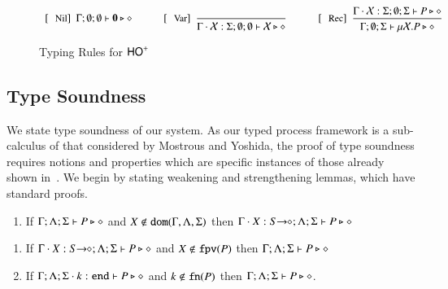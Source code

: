 \begin{figure}[!t]
\[\begin{array}{c}
		\trule{Nil}~~\Gamma; \emptyset; \emptyset \proves \inact \hastype \Proc
\qquad \quad
		\trule{Var}~~\tree{
	
		}{
			\Gamma \cat \rvar{X}: \Sigma; \emptyset; \emptyset  \proves \rvar{X} \hastype \Proc
		}
		\qquad\quad 

	 	\trule{Rec}~~\tree{
			\Gamma \cat \rvar{X}: \Sigma; \emptyset; \Sigma  \proves P \hastype \Proc
		}{
			\Gamma ; \emptyset; \Sigma  \proves \recp{X}{P} \hastype \Proc
		}


	\end{array}
\]
\caption{Typing Rules for $\mathsf{HO}^+$\label{fig:typerulesmy}}
\end{figure}
\newpage


\subsection{Type Soundness}
We state type soundness of our system.
As our typed process framework is a sub-calculus of that considered by Mostrous and Yoshida, the proof of type soundness requires notions and properties which are specific instances of those already shown in~\cite{}.
We begin by stating weakening and strengthening lemmas, which have standard proofs.



\begin{lemma}\label{l:weak}
\begin{enumerate}[$-$]
\item If $\Gamma; \Lambda; \Sigma   \vdash P \triangleright \diamond$ and $X \not\in \mathtt{dom}(\Gamma,\Lambda,\Sigma)$ then $\Gamma\cdot X: S\!\! \rightarrow\!\! \diamond; \Lambda; \Sigma   \vdash P \triangleright \diamond$ 
\end{enumerate}
\end{lemma}

\begin{lemma}\label{l:stren}
\begin{enumerate}[$-$]
\item If $\Gamma \cdot X: S\!\! \rightarrow\!\! \diamond; \Lambda; \Sigma   \vdash P \triangleright \diamond$ and $X \not\in \mathtt{fpv}(P)$ then $\Gamma; \Lambda; \Sigma   \vdash P \triangleright \diamond$ 
\item If $\Gamma; \Lambda; \Sigma \cdot k: \mathtt{end}  \vdash P \triangleright \diamond$ and $k \not\in \mathtt{fn}(P)$ then $\Gamma; \Lambda; \Sigma \vdash P \triangleright \diamond$.
\end{enumerate}
\end{lemma}

